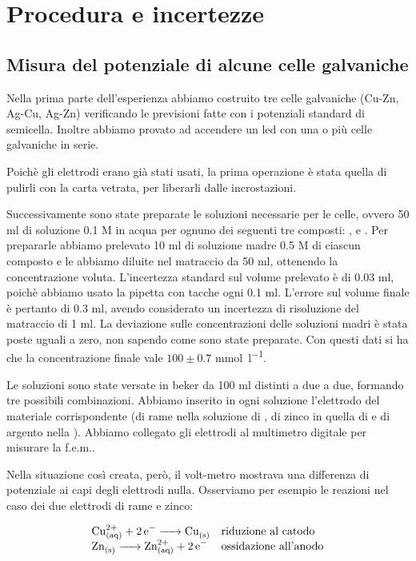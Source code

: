 \section*{Procedura e incertezze}

\subsection*{Misura del potenziale di alcune celle galvaniche}

Nella prima parte dell'esperienza abbiamo costruito tre celle galvaniche (Cu-Zn, Ag-Cu, Ag-Zn) verificando le previsioni fatte con i potenziali standard di semicella.
Inoltre abbiamo provato ad accendere un led con una o più celle galvaniche in serie.

Poichè gli elettrodi erano già stati usati, la prima operazione è stata quella di pulirli con la carta vetrata, per liberarli dalle incrostazioni.

Successivamente sono state preparate le soluzioni necessarie per le celle, ovvero 50 ml di soluzione 0.1 M in acqua per ognuno dei seguenti tre composti: ,  e .
Per prepararle abbiamo prelevato 10 ml di soluzione madre 0.5 M di ciascun composto e le abbiamo diluite nel matraccio da 50 ml, ottenendo la concentrazione voluta.
L'incertezza standard sul volume prelevato è di 0.03 ml, poichè abbiamo usato la pipetta con tacche ogni 0.1 ml.
L'errore sul volume finale è pertanto di 0.3 ml, avendo considerato un incertezza di risoluzione del matraccio di 1 ml.
La deviazione sulle concentrazioni delle soluzioni madri è stata poste uguali a zero, non sapendo come sono
state preparate.
Con questi dati si ha che la concentrazione finale vale $100 \pm 0.7$ \si{\milli\mol\per\litre}.

Le soluzioni sono state versate in beker da 100 ml distinti a due a due, formando tre possibili combinazioni.
Abbiamo inserito in ogni soluzione l'elettrodo del materiale corrispondente (di rame nella soluzione di , di zinco in quella di  e di argento nella ).
Abbiamo collegato gli elettrodi al multimetro digitale per misurare la f.e.m..

Nella situazione così creata, però, il volt-metro mostrava una differenza di potenziale ai capi degli elettrodi nulla.
Osserviamo per esempio le reazioni nel caso dei due elettrodi di rame e zinco:

\begin{equation}
    \begin{array}{l l}
        \ce{Cu^{2+}_{(aq)} + 2e- -> Cu_{(s)}} & \text{riduzione al catodo} \\
        \ce{Zn_{(s)} -> Zn^{2+}_{(aq)} + 2e-} & \text{ossidazione all'anodo} \\
    \end{array}
\end{equation}

